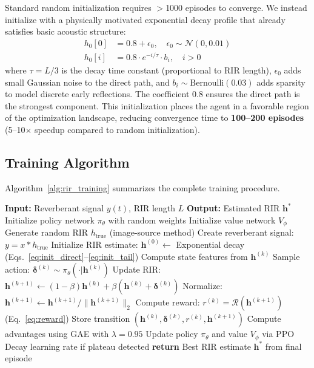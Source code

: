 \documentclass[10pt,conference]{IEEEtran}
\begin{document}
Standard random initialization requires $>$1000 episodes to converge. We instead initialize with a physically motivated exponential decay profile that already satisfies basic acoustic structure:
\begin{align}
h_0[0] &= 0.8 + \epsilon_0, \quad \epsilon_0 \sim \mathcal{N}(0, 0.01) \label{eq:init_direct}\\
h_0[i] &= 0.8 \cdot e^{-i/\tau} \cdot b_i, \quad i > 0 \label{eq:init_tail}
\end{align}
where $\tau = L/3$ is the decay time constant (proportional to RIR length), $\epsilon_0$ adds small Gaussian noise to the direct path, and $b_i \sim \text{Bernoulli}(0.03)$ adds sparsity to model discrete early reflections. The coefficient 0.8 ensures the direct path is the strongest component. This initialization places the agent in a favorable region of the optimization landscape, reducing convergence time to \textbf{100--200 episodes} (5--10$\times$ speedup compared to random initialization).

\subsection{Training Algorithm}

Algorithm~\ref{alg:rir_training} summarizes the complete training procedure.

\begin{algorithm}[t]
\caption{Multi-Head RL for Blind RIR Estimation}
\label{alg:rir_training}
\small
\begin{algorithmic}[1]
\STATE \textbf{Input:} Reverberant signal $y(t)$, RIR length $L$
\STATE \textbf{Output:} Estimated RIR $\mathbf{h}^*$
\STATE Initialize policy network $\pi_\theta$ with random weights
\STATE Initialize value network $V_\phi$
    \STATE Generate random RIR $h_{\text{true}}$ (image-source method)
    \STATE Create reverberant signal: $y = x * h_{\text{true}}$
    \STATE Initialize RIR estimate: $\mathbf{h}^{(0)} \gets$ Exponential decay (Eqs.~\ref{eq:init_direct}--\ref{eq:init_tail})
        \STATE Compute state features from $\mathbf{h}^{(k)}$
        \STATE Sample action: $\boldsymbol{\delta}^{(k)} \sim \pi_\theta(\cdot|\mathbf{h}^{(k)})$
        \STATE Update RIR: $\mathbf{h}^{(k+1)} \gets (1-\beta)\mathbf{h}^{(k)} + \beta(\mathbf{h}^{(k)} + \boldsymbol{\delta}^{(k)})$
        \STATE Normalize: $\mathbf{h}^{(k+1)} \gets \mathbf{h}^{(k+1)} / \|\mathbf{h}^{(k+1)}\|_2$
        \STATE Compute reward: $r^{(k)} = \mathcal{R}(\mathbf{h}^{(k+1)})$ (Eq.~\ref{eq:reward})
        \STATE Store transition $(\mathbf{h}^{(k)}, \boldsymbol{\delta}^{(k)}, r^{(k)}, \mathbf{h}^{(k+1)})$
    \ENDFOR
    \STATE Compute advantages using GAE with $\lambda=0.95$
    \STATE Update policy $\pi_\theta$ and value $V_\phi$ via PPO
    \STATE Decay learning rate if plateau detected
\ENDFOR
\STATE \textbf{return} Best RIR estimate $\mathbf{h}^*$ from final episode
\end{algorithmic}
\end{algorithm}
\end{document}

